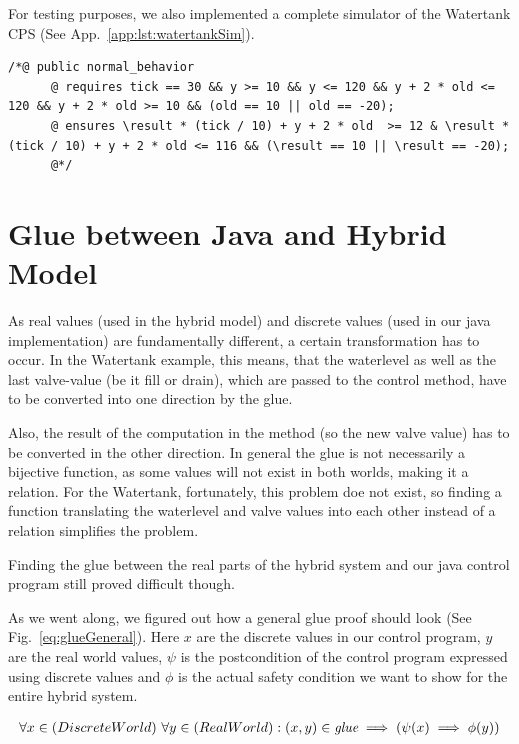 For testing purposes, we also implemented a complete simulator of the Watertank CPS (See App.~\ref{app:lst:watertankSim}).

\begin{lstlisting}[label=lst:JDL]
	/*@ public normal_behavior 
	  @ requires tick == 30 && y >= 10 && y <= 120 && y + 2 * old <= 120 && y + 2 * old >= 10 && (old == 10 || old == -20);
	  @ ensures \result * (tick / 10) + y + 2 * old  >= 12 & \result * (tick / 10) + y + 2 * old <= 116 && (\result == 10 || \result == -20); 
	  @*/
\end{lstlisting} 

\section{Glue between Java and Hybrid Model}
\label{sec:Watertank:Glue}

As real values (used in the hybrid model) and discrete values (used in our java implementation) are fundamentally different, a certain transformation has to occur.  In the Watertank example, this means, that the waterlevel as well as the last valve-value (be it fill or drain), which are passed to the control method, have to be converted into one direction by the glue. 

Also, the result of the computation in the method (so the new valve value) has to be converted in the other direction. In general the glue is not necessarily a bijective function, as some values will not exist in both worlds, making it a relation. For the Watertank, fortunately, this problem doe not exist, so finding a function translating the waterlevel and valve values into each other instead of a relation simplifies the problem.

Finding the glue between the real parts of the hybrid system and our java control program still proved difficult though.

As we went along, we figured out how a general glue proof should look (See Fig.~\ref{eq:glueGeneral}). Here \(x\) are the discrete values in our control program, \(y\) are the real world values, \(\psi\) is the postcondition of the control program expressed using discrete values and \(\phi\) is the actual safety condition we want to show for the entire hybrid system.

\begin{equation}
	\centering
	\begin{split}
		\forall x \in (Discrete World)~\forall y \in (Real World):(x,y) \in \textit{glue} \implies (\psi(x) \implies \phi(y))
	\end{split}
	\label{eq:glueGeneral}
\end{equation}

